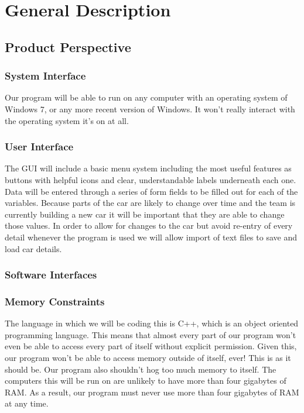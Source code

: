 \documentclass[onecolumn, draftclsnofoot,10pt, compsoc]{IEEEtran}
\begin{document}
\section{General Description}
    
    \subsection{Product Perspective}
    
        \subsubsection{System Interface}    %
        Our program will be able to run on any computer with an operating system of Windows 7, or any more recent version of Windows.
        It won't really interact with the operating system it's on at all.
        
        \subsubsection{User Interface}      %
        The GUI will include a basic menu system including the most useful features as buttons with helpful icons and clear, understandable labels underneath each one. 
        Data will be entered through a series of form fields to be filled out for each of the variables. 
        Because parts of the car are likely to change over time and the team is currently building a new car it will be important that they are able to change those values. 
        In order to allow for changes to the car but avoid re-entry of every detail whenever the program is used we will allow import of text files to save and load car details.
        
        \subsubsection{Software Interfaces} %
        
        \subsubsection{Memory Constraints}  %
        The language in which we will be coding this is C++, which is an object oriented programming language. This means that almost every part of our program won't even be able to access every part of itself without explicit permission. Given this, our program won't be able to access memory outside of itself, ever! This is as it should be. Our program also shouldn't hog too much memory to itself. The computers this will be run on are unlikely to have more than four gigabytes of RAM. As a result, our program must never use more than four gigabytes of RAM at any time.
    
\end{document}
